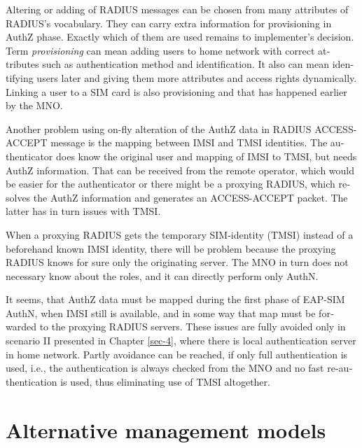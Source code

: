 \documentclass[12pt,a4paper,english]{tutthesis}
\begin{document}
\begin{otherlanguage}{english}
Altering or adding of  RADIUS messages can be chosen from many
attributes of RADIUS's vocabulary. They can carry extra information
for provisioning in AuthZ phase. Exactly which of them are used
remains to implementer's  decision. 
Term \emph{provisioning} can mean adding users to home network with correct
attributes such as authentication method and identification.
It also can mean identifying users later and giving
them more attributes and access rights dynamically.
Linking a user to a SIM card is also provisioning and that has
happened earlier by the MNO.













Another problem using on-fly alteration of the AuthZ data in RADIUS ACCESS-ACCEPT message
is the mapping between IMSI and TMSI identities.
The authenticator does know the original user and mapping of IMSI to
TMSI, but needs AuthZ information. That can be received from the
remote operator, which would be easier for the
authenticator or there might be a proxying RADIUS, which resolves the
AuthZ information and generates an ACCESS-ACCEPT packet. The latter
has in turn issues with TMSI.

When a proxying RADIUS gets the temporary SIM-identity (TMSI) instead
of a beforehand known IMSI identity, there will be problem
because the proxying RADIUS knows for sure only the originating
server.  The MNO in turn does not necessary know about the roles, and
it can directly perform only AuthN.

It seems, that AuthZ data must be mapped during the first phase of
EAP-SIM AuthN, when IMSI still is available, and in some way
that map must be forwarded to the proxying RADIUS servers.
These issues are fully avoided only in scenario II presented in Chapter
\ref{sec-4}, where there is local authentication server in home network.
Partly avoidance can be reached, if only full authentication is
used, i.e., the authentication is always checked from the MNO and no
fast re-authentication is used, thus eliminating use of TMSI altogether.


\section{Alternative management models}
\label{sec-6-6}


\end{otherlanguage}
\end{document}
